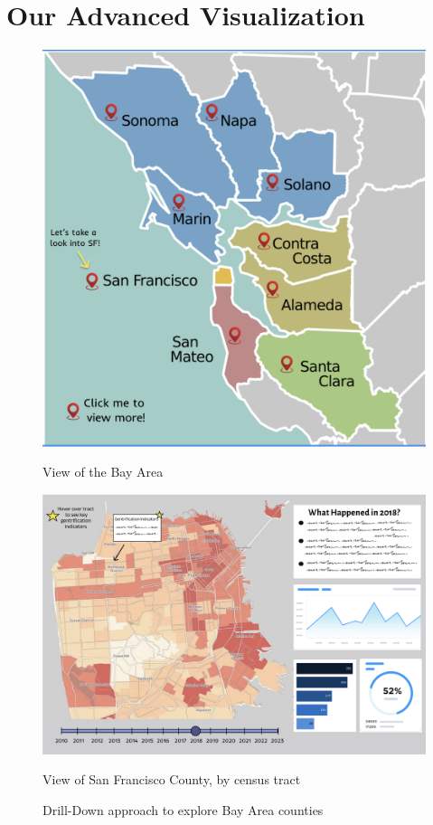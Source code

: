 \documentclass{article}
\begin{document}
\section{Our Advanced Visualization}

\graphicspath{{../imgs/}}

\begin{figure}[h!]
    \centering
    \begin{minipage}{0.48\textwidth}
        \centering
        \includegraphics[width=\linewidth]{fig1.png}
        \caption{View of the Bay Area}
        \label{fig:first}
    \end{minipage}\hfill 
    \begin{minipage}{0.48\textwidth}
        \centering
        \includegraphics[width=\linewidth]{fig2.png}
        \caption{View of San Francisco County, by census tract}
        \label{fig:second}
    \end{minipage}
    \caption{Drill-Down approach to explore Bay Area counties}
    \label{fig:combined}
\end{figure}
\end{document}
